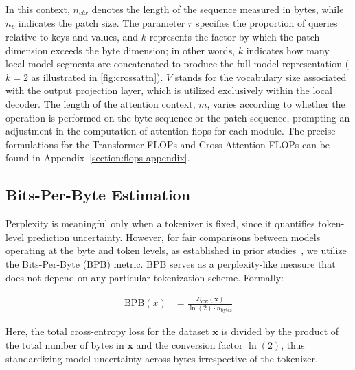 In this context, $n_{ctx}$ denotes the length of the sequence measured in bytes, while $n_p$ indicates the patch size. The parameter $r$ specifies the proportion of queries relative to keys and values, and $k$ represents the factor by which the patch dimension exceeds the byte dimension; in other words, $k$ indicates how many local model segments are concatenated to produce the full model representation ($k=2$ as illustrated in \autoref{fig:crossattn}). $V$ stands for the vocabulary size associated with the output projection layer, which is utilized exclusively within the local decoder. The length of the attention context, $m$, varies according to whether the operation is performed on the byte sequence or the patch sequence, prompting an adjustment in the computation of attention flops for each module. The precise formulations for the Transformer-FLOPs and Cross-Attention FLOPs can be found in Appendix~\ref{section:flops-appendix}.

\subsection{Bits-Per-Byte Estimation} Perplexity is meaningful only when a tokenizer is fixed, since it quantifies token-level prediction uncertainty. However, for fair comparisons between models operating at the byte and token levels, as established in prior studies~\citep{xue2022byt5, yu2023megabyte, wang2024mambabyte}, we utilize the Bits-Per-Byte (BPB) metric. BPB serves as a perplexity-like measure that does not depend on any particular tokenization scheme. Formally:

\begin{align}
    \text{BPB}(x)&= \frac{\mathcal{L}_{CE}(\pmb{x})}{\ln(2)\cdot n_{\text{bytes}}}
\end{align}

Here, the total cross-entropy loss for the dataset $\pmb{x}$ is divided by the product of the total number of bytes in $\pmb{x}$ and the conversion factor $\ln(2)$, thus standardizing model uncertainty across bytes irrespective of the tokenizer.

